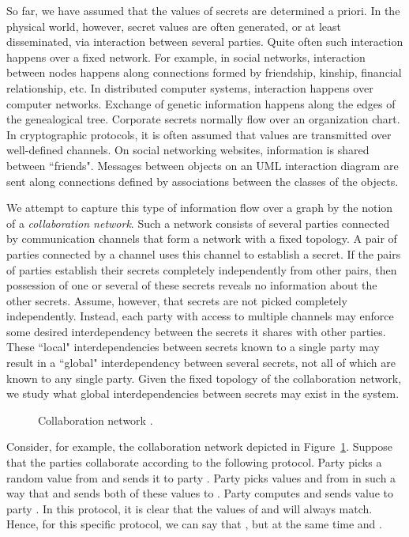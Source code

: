 \documentclass{llncs}
\begin{document}
So far, we have assumed that the values of secrets are determined a priori. In the physical world, however, secret values are often generated, or at least disseminated, via interaction between several parties. Quite often such interaction happens over a fixed network. For example, in social networks, interaction between nodes happens along connections formed by friendship, kinship, financial relationship, etc.  In distributed computer systems, interaction happens over computer networks. Exchange of genetic information happens along the edges of the genealogical tree. Corporate secrets normally flow over an organization chart. In cryptographic protocols, it is often assumed that values are transmitted over well-defined channels. On social networking websites, information is shared between ``friends". Messages between objects on an UML interaction diagram are sent along connections defined by associations between the classes of the objects.

We attempt to capture this type of information flow over a graph by the notion of a {\em collaboration network}. Such a network consists of several parties connected by communication channels that form a network with a fixed topology. A pair of parties connected by a channel uses this channel to establish a secret. If the pairs of parties establish their secrets completely independently from other pairs, then possession of one or several of these secrets reveals no information about the other secrets. Assume, however, that secrets are not picked completely independently. Instead, each party with access to multiple channels may enforce some desired interdependency between the secrets it shares with other parties. These ``local" interdependencies between secrets known to a single party may result in a ``global" interdependency between several secrets, not all of which are known to any single party. Given the fixed topology of the collaboration network, we study what global interdependencies between secrets may exist in the system.
\begin{figure}[htbp]
   \centering
   \caption{Collaboration network .}
   \label{computation_graph}
\end{figure}

Consider, for example, the collaboration network  depicted in Figure~\ref{computation_graph}.  Suppose that the parties collaborate according to the following protocol.  Party  picks a random value  from  and sends it to party . Party  picks values  and  from  in such a way that  and sends both of these values to . Party  computes  and sends value  to party . In this protocol, it is clear that the values of  and  will always match. Hence, for this specific protocol, we can say that , but at the same time  and .
\end{document}
